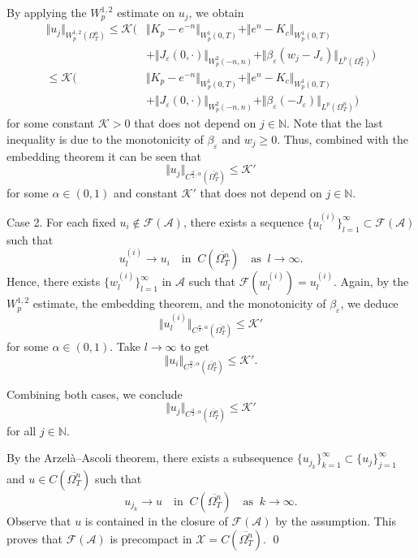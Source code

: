 \documentclass[11pt, a4paper, leqno]{amsart}
\numberwithin{equation}{section}
\theoremstyle{plain}
\theoremstyle{definition}
\theoremstyle{remark}
\def\le{\leqslant}
\def\leq{\leqslant}
\def\geq{\geqslant}
\begin{document}
{
By applying the $W^{1,2}_p$ estimate on $u_j$, we obtain
\begin{align*}
\Vert u_j \Vert_{W^{1,2}_p(\Omega_T^n)}
\leq \mathcal{K}\Big(
&\Vert K_p-e^{-n}\Vert_{W^1_p(0,T)}
+\Vert e^n-K_c\Vert_{W^1_p(0,T)}
\\
&+\Vert J_{\varepsilon}(0,\cdot)\Vert_{W^{2}_p(-n,n)}
+\Vert \beta_\varepsilon(w_j-J_{\varepsilon})
\Vert_{L^p(\Omega_T^n)}
\Big)
\\
\leq \mathcal{K}\Big(
&\Vert K_p-e^{-n}\Vert_{W^1_p(0,T)}
+\Vert e^n-K_c\Vert_{W^1_p(0,T)}
\\
&+\Vert J_{\varepsilon}(0,\cdot)\Vert_{W^{2}_p(-n,n)}
+\Vert \beta_\varepsilon(-J_{\varepsilon})
\Vert_{L^p(\Omega_T^n)}
\Big)
\end{align*}
}
for some constant $\mathcal{K}>0$ that does not depend on
$j\in\mathbb{N}$.
Note that the last inequality is due to the monotonicity of
$\beta_\varepsilon$ and $w_j\geq0$.
Thus, combined with the embedding theorem it can be seen that
\[
    \Vert u_j\Vert_
    {C^{\frac{\alpha}{2},\alpha}(\overline{\Omega_T^n})}
    \le \mathcal{K}'
\]
for some $\alpha\in(0,1)$ and constant $\mathcal{K}'$ that does not
depend on $j\in\mathbb{N}$.

\medskip
\noindent Case 2.
For each fixed $u_i\notin \mathcal{F}(\mathcal{A})$,
there exists a sequence $\{u^{(i)}_l\}_{l=1}^\infty
\subset\mathcal{F}(\mathcal{A})$ such that
\[
    u^{(i)}_l \rightarrow u_i
    \quad \text{in }\ C(\overline{\Omega_T^n})
    \quad \text{as }\ l\rightarrow\infty.
\]
Hence, there exists $\{w^{(i)}_l\}_{l=1}^\infty$ in $\mathcal{A}$
such that $\mathcal{F}(w^{(i)}_l)=u^{(i)}_l$.
Again, by the $W^{1,2}_p$ estimate, the embedding theorem, and the
monotonicity of $\beta_\varepsilon$, we deduce
\[
    \Vert u_l^{(i)}\Vert_
    {C^{\frac{\alpha}{2},\alpha}(\overline{\Omega_T^n})}
    \leq \mathcal{K}'
\]
for some $\alpha\in(0,1)$.
Take $l\rightarrow\infty$ to get
\[
    \Vert u_i\Vert_
    {C^{\frac{\alpha}{2},\alpha}(\overline{\Omega_T^n})}
    \leq \mathcal{K}'.
\]

Combining both cases, we conclude
\[
    \Vert u_j\Vert_
    {C^{\frac{\alpha}{2},\alpha}(\overline{\Omega_T^n})}
    \leq \mathcal{K}'
\]
for all $j\in\mathbb{N}$.

By the Arzel\`a--Ascoli theorem, there exists a subsequence
$\{u_{j_k}\}_{k=1}^\infty \subset \{u_j\}_{j=1}^\infty$ and
$u\in C(\overline{\Omega_T^n})$
such that
\[
    u_{j_k}\rightarrow u
    \quad \text{in }\ C(\overline{\Omega_T^n})
    \quad \text{as }\ k\rightarrow\infty.
\]
Observe that $u$ is contained in the closure of
$\mathcal{F}(\mathcal{A})$ by the assumption.
This proves that $\mathcal{F}(\mathcal{A})$ is precompact in
$\mathcal{X}=C(\overline{\Omega_T^n}).$
\qed
\end{document}
